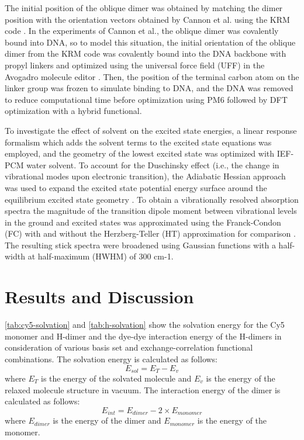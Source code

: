 The initial position of the oblique dimer was obtained by matching the dimer position with the orientation vectors obtained by Cannon et al. using the KRM code \cite{Cannon2017}. In the experiments of Cannon et al., the oblique dimer was covalently bound into DNA, so to model this situation, the initial orientation of the oblique dimer from the KRM code was covalently bound into the DNA backbone with propyl linkers and optimized using the universal force field (UFF) in the Avogadro molecule editor \cite{Rappe1992e, Hanwell2012}. Then, the position of the terminal carbon atom on the linker group was frozen to simulate binding to DNA, and the DNA was removed to reduce computational time before optimization using PM6 followed by DFT optimization with a hybrid functional. 

To investigate the effect of solvent on the excited state energies, a linear response formalism which adds the solvent terms to the excited state equations was employed, and the geometry of the lowest excited state was optimized with IEF-PCM water solvent. To account for the Duschinsky effect (i.e., the change in vibrational modes upon electronic transition), the Adiabatic Hessian approach was used to expand the excited state potential energy surface around the equilibrium excited state geometry \cite{AvilaFerrer2012b, Adamo2013b}. To obtain a vibrationally resolved absorption spectra the magnitude of the transition dipole moment between vibrational levels in the ground and excited states was approximated using the Franck-Condon (FC) with and without the Herzberg-Teller (HT) approximation for comparison \cite{Baiardi2013a, Sharp1964a, Franck1926a, Condon1926, Herzberg1933}. The resulting stick spectra were broadened using Gaussian functions with a half-width at half-maximum (HWHM) of 300 cm-1.

\section{Results and Discussion}

\autoref{tab:cy5-solvation} and \autoref{tab:h-solvation} show the solvation energy for the Cy5 monomer and H-dimer and the dye-dye interaction energy of the H-dimers in consideration of various basis set and exchange-correlation functional combinations. The solvation energy is calculated as follows:
\begin{equation}\label{esol}
    E_{sol}=E_{T}-E_{v}
\end{equation}
where $E_{T}$ is the energy of the solvated molecule and $E_{v}$ is the energy of the relaxed molecule structure in vacuum. The interaction energy of the dimer is calculated as follows:
\begin{equation}\label{eint}
    E_{int}=E_{dimer}-2\times E_{monomer}
\end{equation}
where $E_{dimer}$ is the energy of the dimer and $E_{monomer}$ is the energy of the monomer. 

